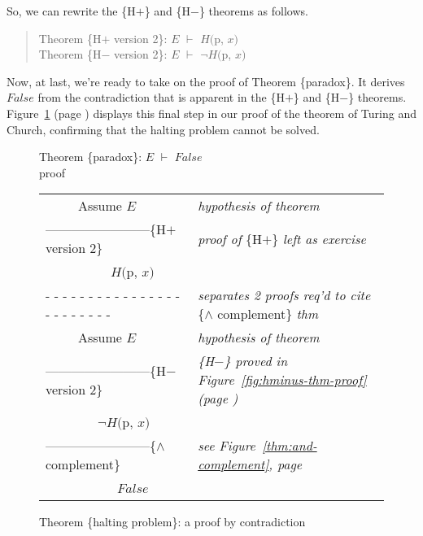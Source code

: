 So, we can rewrite the \{H$+$\} and \{H$-$\} theorems as follows.
\begin{quote}
Theorem \{H$+$ version 2\}: $E$ $\vdash$ $H($p, $x)$ \\
Theorem \{H$-$ version 2\}: $E$ $\vdash$ $\neg H($p, $x)$
\end{quote}

Now, at last, we're ready to take on
the proof of Theorem \{paradox\}.
It derives $False$ from the contradiction that is apparent
in the \{H$+$\} and \{H$-$\} theorems.
Figure~\ref{fig:proof-paradox-thm} (page \pageref{fig:proof-paradox-thm})
displays this final step in our proof
of the theorem of Turing and Church,
confirming that the halting problem cannot be solved.

\begin{figure}
Theorem \{paradox\}: $E$ $\vdash$ $False$\\
proof
\begin{center}
\begin{tabular}{ll}
~~~~~Assume $E$                                 &\emph{hypothesis of theorem}\\
------------------------\{H$+$ version 2\}      &\emph{proof of} \{H$+$\} \emph{left as exercise}\\
~~~~~~~~~~$H($p, $x)$                           &\\
 - - - - - - - - - - - - - - - - - - - - - - - -&\emph{separates 2 proofs req'd to cite} \{$\wedge$ complement\} \emph{thm}\\
~~~~~Assume $E$                                 &\emph{hypothesis of theorem}\\
------------------------\{H$-$ version 2\}      &\emph{\{H$-$\} proved in Figure~\ref{fig:hminus-thm-proof} (page \pageref{fig:hminus-thm-proof})}\\
~~~~~~~~$\neg H($p, $x)$                        &\\
------------------------\{$\wedge$ complement\} &\emph{see Figure~\ref{thm:and-complement}, page \pageref{thm:and-complement}}\\
~~~~~~~~~~~$False$                              &\\
\end{tabular}
\end{center}
\caption{Theorem \{halting problem\}: a proof by contradiction}
\label{fig:proof-paradox-thm}
\end{figure}


